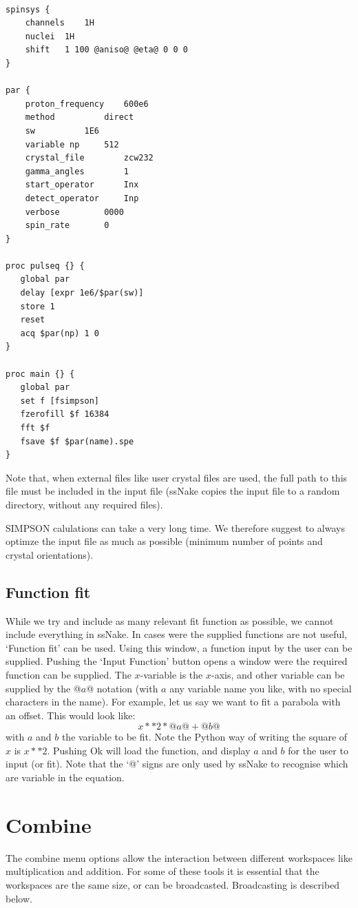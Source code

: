 \documentclass[11pt,a4paper]{article}
\begin{document}
\begin{lstlisting}[frame=single]  % Start your code-block

spinsys {
    channels	1H
    nuclei	1H
    shift	1 100 @aniso@ @eta@ 0 0 0
}

par {
	proton_frequency	600e6
	method 			direct
	sw			1E6
	variable np		512
	crystal_file	  	zcw232
	gamma_angles		1
	start_operator		Inx
	detect_operator		Inp
	verbose			0000
	spin_rate 		0
}

proc pulseq {} {
   global par
   delay [expr 1e6/$par(sw)]
   store 1
   reset
   acq $par(np) 1 0
}

proc main {} {
   global par
   set f [fsimpson]
   fzerofill $f 16384
   fft $f
   fsave $f $par(name).spe
}
\end{lstlisting}
Note that, when external files like user crystal files are used, the full path to this file must be
included in the input file (ssNake copies the input file to a random directory, without any
required files).

SIMPSON calulations can take a very long time. We therefore suggest to always optimze the input file
as much as possible (minimum number of points and crystal orientations).




\subsection{Function fit}
While we try and include as  many relevant fit function as possible, we cannot include everything in
ssNake. In cases were the supplied functions are not useful, `Function fit' can be used. Using this
window, a function input by the user can be supplied. Pushing the `Input Function' button opens a
window were the required function can be supplied. The $x$-variable is the $x$-axis, and other
variable can be supplied by the @$a$@ notation (with $a$ any variable name you like, with no special
characters in the name). For example, let us say we want to fit a parabola with an offset. This would look like:
\begin{equation}
  x ** 2 * @a@ + @b@
\end{equation}
with $a$ and $b$ the variable to be fit. Note the Python way of writing the square of $x$ is $x **
2$. Pushing Ok will load the function, and display $a$ and $b$ for the user to input (or fit). Note
that the `@' signs are only used by ssNake to recognise which are variable in the equation.


\section{Combine}
The combine menu options allow the interaction between different workspaces like multiplication and addition. For some of these tools it is essential that the workspaces
are the same size, or can be broadcasted. Broadcasting is described below.
\end{document}
